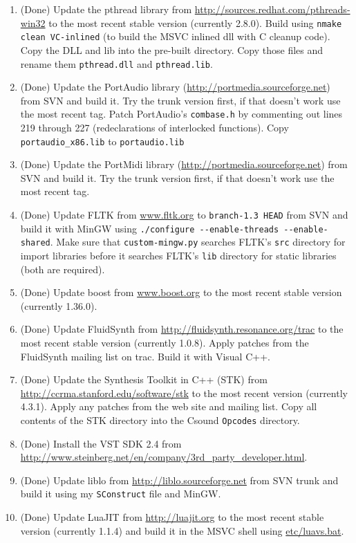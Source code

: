 \documentclass[11pt,letterpaper,onecolumn]{scrartcl}
\begin{document}
\begin{sloppypar}
\begin{enumerate}
\begin{enumerate}
	    \item (Done) Update the pthread library from \url{http://sources.redhat.com/pthreads-win32} to the most recent stable version (currently 2.8.0). Build using \texttt{nmake clean VC-inlined} (to build the MSVC inlined dll with C cleanup code). Copy the DLL and lib into the pre-built directory. Copy those files and rename them \texttt{pthread.dll} and \texttt{pthread.lib}.
			\item (Done) Update the PortAudio library (\url{http://portmedia.sourceforge.net}) from SVN and build it. Try the trunk version first, if that doesn't work use the most recent tag. Patch PortAudio's \texttt{combase.h} by commenting out lines 219 through 227 (redeclarations of interlocked functions). Copy \verb|portaudio_x86.lib| to \verb|portaudio.lib|
			\item (Done) Update the PortMidi library (\url{http://portmedia.sourceforge.net}) from SVN and build it. Try the trunk version first, if that doesn't work use the most recent tag.
    	\item (Done) Update FLTK from \url{www.fltk.org} to \texttt{branch-1.3 HEAD} from SVN and build it with MinGW using \verb|./configure --enable-threads --enable-shared|. Make sure that \texttt{custom-mingw.py} searches FLTK's \texttt{src} directory for import libraries before it searches FLTK's \texttt{lib} directory for static libraries (both are required).
    	\item (Done) Update boost from \url{www.boost.org} to the most recent stable version (currently 1.36.0).
    	\item (Done) Update FluidSynth from \url{http://fluidsynth.resonance.org/trac} to the most recent stable version (currently 1.0.8). Apply patches from the FluidSynth mailing list on trac. Build it with Visual C++.
    	\item (Done) Update the Synthesis Toolkit in C++ (STK) from \url{http://ccrma.stanford.edu/software/stk} to the most recent version (currently 4.3.1). Apply any patches from the web site and mailing list. Copy all contents of the STK directory into the Csound \texttt{Opcodes} directory.
    	\item (Done) Install the VST SDK 2.4 from \url{http://www.steinberg.net/en/company/3rd_party_developer.html}.
    	\item (Done) Update liblo from \url{http://liblo.sourceforge.net} from SVN trunk and build it using my \texttt{SConstruct} file and MinGW.
    	\item (Done) Update LuaJIT from \url{http://luajit.org} to the most recent stable version (currently 1.1.4) and build it in the MSVC shell using \url{etc/luavs.bat}.

\end{enumerate}
\end{enumerate}
\end{sloppypar}
\end{document}
